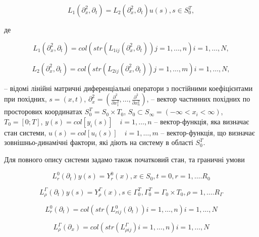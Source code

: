 \begin{equation}
\label{eq:stoyan_main_p1}
L_1(\partial_x^2, \partial_t) = L_2(\partial_x^2, \partial_t)u(s), s\in S_0^T,
\end{equation}

де

\begin{equation}
\label{eq:stoyan_main_p2}
L_1(\partial_x^2, \partial_t) = col(str(L_{1ij}(\partial_x^2, \partial_t))j=1,\ldots,n) i = 1,\ldots,N,
\end{equation}

\begin{equation}
\label{eq:stoyan_main_p3}
L_2(\partial_x^2, \partial_t) = col(str(L_{2ij}(\partial_x^2, \partial_t))j=1,\ldots,m) i = 1,\ldots,N,
\end{equation}

– відомі лінійні матричні диференціальні оператори з постійними коефіцієнтами при похідних, $s=(x,t)$,
$\partial_x^2 = \left(\frac{\partial^2}{\partial x_1^2}, \ldots, \frac{\partial^2}{\partial x_n^2} \right)$,
  – вектор
частинних похідних по просторових координатах $S_0^T = S_0\times T_0$,
$S_0 \subset S_\infty = (-\infty < x_i < \infty)$, $T_0 = [0; T]$, $y(s) = col[y_i(s)]\quad i = 1,\ldots,n$  –
вектор-функція, яка визначає стан системи, $u(s) = col[u_i(s)]\quad i=1,\ldots,m$ –
вектор-функція, що визначає зовнішньо-динамічні фактори, які діють на систему в області $S_0^T$.

Для повного опису системи задамо також початковий стан, та граничні умови

\begin{equation}
\label{eq:stoyan_edge_p1}
L_r^0(\partial_t)y(s) = Y_r^0(x), x \in S_0, t=0, r = 1,\ldots.R_0
\end{equation}

\begin{equation}
\label{eq:stoyan_edge_p2}
L_\rho^\Gamma(\partial_t)y(s) = Y_\rho^\Gamma(x), s \in \Gamma_0^T, \Gamma_0^T=\Gamma_0\times T_0, \rho = 1,\ldots.R_\Gamma
\end{equation}

\begin{equation}
\label{eq:stoyan_edge_p3}
L_r^0(\partial_t) = col(str(L_{rij}^0(\partial_t))i=1,\ldots,n)i=1,\ldots,N
\end{equation}

\begin{equation}
\label{eq:stoyan_edge_p4}
L_\rho^\Gamma(\partial_x) = col(str(L_{\rho ij}^\Gamma)i=1,\ldots,n)i=1,\ldots,N
\end{equation}

